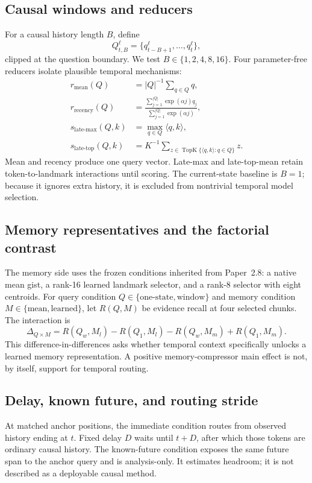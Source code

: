 \documentclass[11pt]{article}
\newcommand{\paperii}{Paper~2.8}
\begin{document}
\subsection{Causal windows and reducers}
For a causal history length $B$, define
\begin{equation}
Q_{t,B}^{\ell}=\{q_{t-B+1}^{\ell},\ldots,q_t^{\ell}\},
\end{equation}
clipped at the question boundary. We test $B\in\{1,2,4,8,16\}$. Four parameter-free reducers isolate plausible temporal mechanisms:
\begin{align}
r_{\mathrm{mean}}(Q)&=|Q|^{-1}\sum_{q\in Q}q,\\
r_{\mathrm{recency}}(Q)&=\frac{\sum_{j=1}^{|Q|}\exp(\alpha j)q_j}{\sum_{j=1}^{|Q|}\exp(\alpha j)},\\
s_{\mathrm{late\mbox{-}max}}(Q,k)&=\max_{q\in Q}\langle q,k\rangle,\\
s_{\mathrm{late\mbox{-}top}}(Q,k)&=K^{-1}\sum_{z\in\operatorname{TopK}\{\langle q,k\rangle:q\in Q\}}z.
\end{align}
Mean and recency produce one query vector. Late-max and late-top-mean retain token-to-landmark interactions until scoring. The current-state baseline is $B=1$; because it ignores extra history, it is excluded from nontrivial temporal model selection.

\subsection{Memory representatives and the factorial contrast}
The memory side uses the frozen conditions inherited from \paperii: a native mean gist, a rank-16 learned landmark selector, and a rank-8 selector with eight centroids. For query condition $Q\in\{\text{one-state},\text{window}\}$ and memory condition $M\in\{\text{mean},\text{learned}\}$, let $R(Q,M)$ be evidence recall at four selected chunks. The interaction is
\begin{equation}
\Delta_{Q\times M}=R(Q_w,M_l)-R(Q_1,M_l)-R(Q_w,M_m)+R(Q_1,M_m).
\end{equation}
This difference-in-differences asks whether temporal context specifically unlocks a learned memory representation. A positive memory-compressor main effect is not, by itself, support for temporal routing.

\subsection{Delay, known future, and routing stride}
At matched anchor positions, the immediate condition routes from observed history ending at $t$. Fixed delay $D$ waits until $t+D$, after which those tokens are ordinary causal history. The known-future condition exposes the same future span to the anchor query and is analysis-only. It estimates headroom; it is not described as a deployable causal method.
\end{document}
